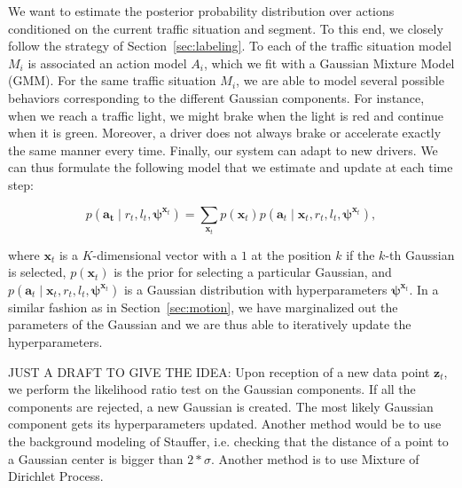 We want to estimate the posterior probability distribution over actions
conditioned on the current traffic situation and segment. To this end, we
closely follow the strategy of Section~\ref{sec:labeling}. To each of the
traffic situation model $M_i$ is associated an action model $A_i$, which we fit
with a Gaussian Mixture Model (GMM). For the same traffic situation $M_i$, we
are able to model several possible behaviors corresponding to the different
Gaussian components. For instance, when we reach a traffic light, we might brake
when the light is red and continue when it is green. Moreover, a driver does not
always brake or accelerate exactly the same manner every time. Finally, our
system can adapt to new drivers. We can thus formulate the following model
that we estimate and update at each time step:

\begin{equation}
\label{eqn:action}
p(\mathbf{a_t} \mid r_t, l_t,\boldsymbol{\psi}^{\mathbf{x}_t})=
\sum_{\mathbf{x}_t} p(\mathbf{x}_t)p(\mathbf{a}_t\mid\mathbf{x}_t,r_t,l_t,
\boldsymbol{\psi}^{\mathbf{x}_t}),
\end{equation}

where $\mathbf{x}_t$ is a $K$-dimensional vector with a $1$ at the position $k$
if the $k$-th Gaussian is selected, $p(\mathbf{x}_t)$ is the prior for selecting
a particular Gaussian, and $p(\mathbf{a}_t\mid\mathbf{x}_t,r_t,l_t,
\boldsymbol{\psi}^{\mathbf{x}_t})$ is a Gaussian distribution with
hyperparameters $\boldsymbol{\psi}^{\mathbf{x}_t}$. In a similar fashion as in
Section~\ref{sec:motion}, we have marginalized out the parameters of the
Gaussian and we are thus able to iteratively update the hyperparameters.

JUST A DRAFT TO GIVE THE IDEA:
Upon reception of a new data point $\mathbf{z}_t$, we perform the likelihood
ratio test on the Gaussian components. If all the components are rejected, a new
Gaussian is created. The most likely Gaussian component gets its hyperparameters
updated. Another method would be to use the background modeling of Stauffer, i.e.
checking that the distance of a point to a Gaussian center is bigger than
$2*\sigma$. Another method is to use Mixture of Dirichlet Process.
